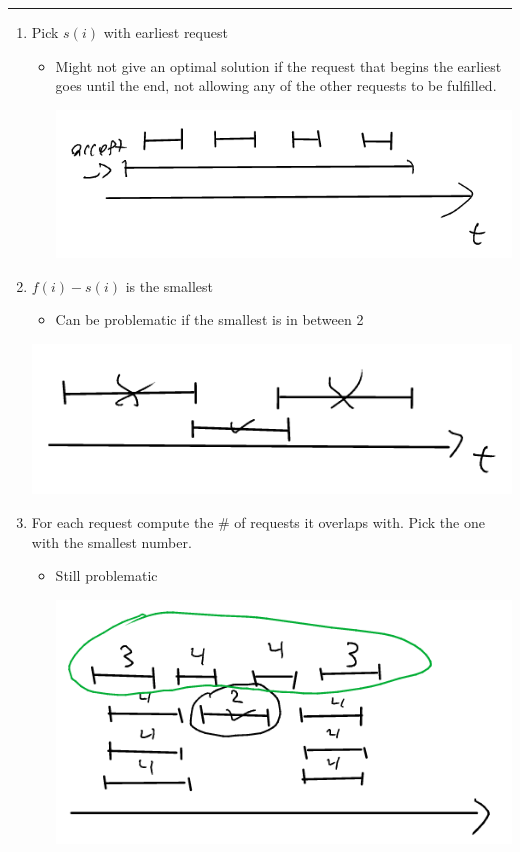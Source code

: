 \documentclass[11pt]{article}
\begin{document}
\noindent\rule{\textwidth}{0.5pt}
\begin{enumerate}
\item Pick \(s(i)\) with earliest request
\begin{itemize}
\item Might not give an optimal solution if the request that begins the earliest goes until the end, not allowing any of the other requests to be fulfilled.
\begin{center}
\includegraphics[width=.9\linewidth]{./Images/i23.png}
\end{center}
\end{itemize}
\item \(f(i)-s(i)\) is the smallest 
\begin{itemize}
\item Can be problematic if the smallest is in between 2
\end{itemize}
\begin{center}
\includegraphics[width=.9\linewidth]{./Images/i24.png}
\end{center}
\item For each request compute the \# of requests it overlaps with. Pick the one with the smallest number.
\begin{itemize}
\item Still problematic
\begin{center}
\includegraphics[width=.9\linewidth]{./Images/i25.png}

\end{center}
\end{itemize}
\end{enumerate}
\end{document}
